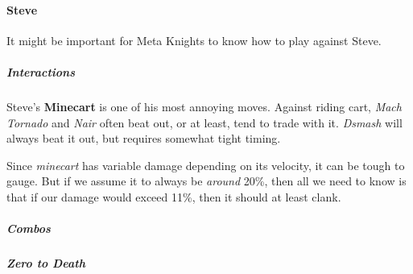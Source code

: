 \paragraph{Steve}

It might be important for Meta Knights to know how to play against Steve.

\subparagraph{Interactions}

Steve's \textbf{Minecart} is one of his most annoying moves. Against riding cart, \textit{Mach Tornado} and \textit{Nair} often beat out, or at least, tend to trade with it. \textit{Dsmash} will always beat it out, but requires somewhat tight timing.

Since \textit{minecart} has variable damage depending on its velocity, it can be tough to gauge. But if we assume it to always be \textit{around} 20\%, then all we need to know is that if our damage would exceed 11\%, then it should at least clank.

\subparagraph{Combos}

\subparagraph{Zero to Death}